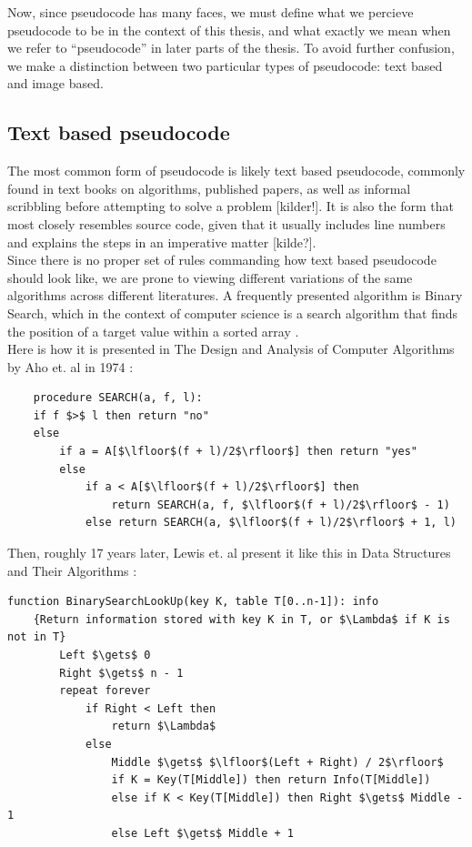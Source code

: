 Now, since pseudocode has many faces, we must define what we percieve pseudocode to be in the context of this thesis, and what exactly we mean when we refer to ``pseudocode'' in later parts of the thesis. To avoid further confusion, we make a distinction between two particular types of pseudocode: text based and image based.

\subsection{Text based pseudocode}

The most common form of pseudocode is likely text based pseudocode, commonly found in text books on algorithms, published papers, as well as informal scribbling before attempting to solve a problem [kilder!]. It is also the form that most closely resembles source code, given that it usually includes line numbers and explains the steps in an imperative matter [kilde?]. \hfill \\

Since there is no proper set of rules commanding how text based pseudocode should look like, we are prone to viewing different variations of the same algorithms across different literatures. A frequently presented algorithm is Binary Search, which in the context of computer science is a search algorithm that finds the position of a target value within a sorted array \cite{BOOK:intro/Cormen/Leiserson}. \hfill \\

Here is how it is presented in The Design and Analysis of Computer Algorithms by Aho et. al in 1974 \cite[139]{BOOK:DesignAnalysis/Aho}:

\begin{lstlisting}
    procedure SEARCH(a, f, l):
    if f $>$ l then return "no"
    else
        if a = A[$\lfloor$(f + l)/2$\rfloor$] then return "yes"
        else
            if a < A[$\lfloor$(f + l)/2$\rfloor$] then
                return SEARCH(a, f, $\lfloor$(f + l)/2$\rfloor$ - 1)
            else return SEARCH(a, $\lfloor$(f + l)/2$\rfloor$ + 1, l)
\end{lstlisting}

Then, roughly 17 years later, Lewis et. al present it like this in Data Structures and Their Algorithms \cite[182]{BOOK:DSA/Lewis}:

\begin{lstlisting}[basicstyle=\small\ttfamily]
    function BinarySearchLookUp(key K, table T[0..n-1]): info
    {Return information stored with key K in T, or $\Lambda$ if K is not in T}
        Left $\gets$ 0
        Right $\gets$ n - 1
        repeat forever
            if Right < Left then
                return $\Lambda$
            else
                Middle $\gets$ $\lfloor$(Left + Right) / 2$\rfloor$
                if K = Key(T[Middle]) then return Info(T[Middle])
                else if K < Key(T[Middle]) then Right $\gets$ Middle - 1
                else Left $\gets$ Middle + 1
\end{lstlisting}

